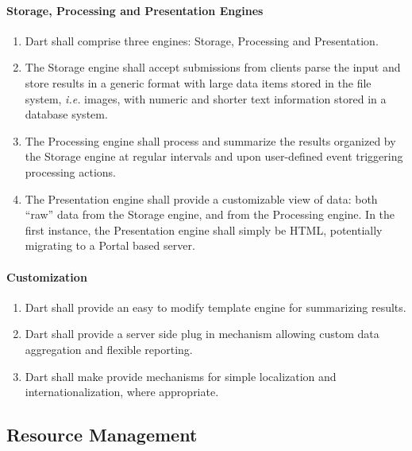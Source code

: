 \documentclass{InsightBook}
\begin{document}
\paragraph{Storage, Processing and Presentation Engines}
\begin{enumerate}
\item Dart shall comprise three engines: Storage, Processing and
Presentation.
\item The Storage engine shall accept submissions from clients parse
the input and store results in a generic format with large data items
stored in the file system, \emph{i.e.} images, with numeric and
shorter text information stored in a database system.
\item The Processing engine shall process and summarize the results
organized by the Storage engine at regular intervals and upon
user-defined event triggering processing actions.
\item The Presentation engine shall provide a customizable view of
data: both ``raw'' data from the Storage engine, and from the
Processing engine.  In the first instance, the Presentation engine
shall simply be HTML, potentially migrating to a Portal based server.
\end{enumerate}

\paragraph{Customization}
\begin{enumerate}
\item Dart shall provide an easy to modify template engine for
summarizing results.
\item Dart shall provide a server side plug in mechanism allowing
custom data aggregation and flexible reporting.
\item Dart shall make provide mechanisms for simple localization and
internationalization, where appropriate.
\end{enumerate} 


\subsection{Resource Management}
\label{Sec:ResourceManagement}
\end{document}
